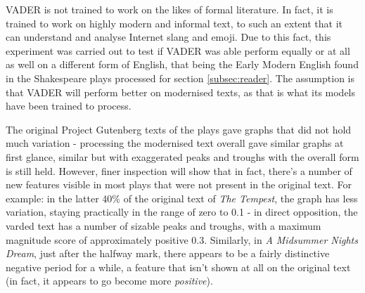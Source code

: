 \documentclass{article}
\begin{document}
        VADER is not trained to work on the likes of formal literature. In fact, it is trained to work on highly modern and informal text, to such an extent that it can understand and analyse Internet slang and emoji. Due to this fact, this experiment was carried out to test if VADER was able perform equally or at all as well on a different form of English, that being the Early Modern English found in the Shakespeare plays processed for section \ref{subsec:reader}. The assumption is that VADER will perform better on modernised texts, as that is what its models have been trained to process.
        
        The original Project Gutenberg texts of the plays gave graphs that did not hold much variation - processing the modernised text overall gave similar graphs at first glance, similar but with exaggerated peaks and troughs with the overall form is still held. However, finer inspection will show that in fact, there's a number of new features visible in most plays that were not present in the original text. For example: in the latter 40\% of the original text of \textit{The Tempest}, the graph has less variation, staying practically in the range of zero to 0.1 - in direct opposition, the varded text has a number of sizable peaks and troughs, with a maximum magnitude score of approximately positive 0.3. Similarly, in \textit{A Midsummer Nights Dream}, just after the halfway mark, there appears to be a fairly distinctive negative period for a while, a feature that isn't shown at all on the original text (in fact, it appears to go become more \textit{positive}).
\end{document}
